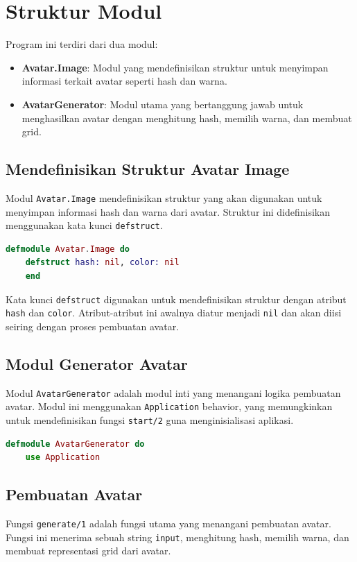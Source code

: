 \section{Struktur Modul}
Program ini terdiri dari dua modul:

\begin{itemize}
	\item \textbf{Avatar.Image}: Modul yang mendefinisikan struktur untuk menyimpan informasi terkait avatar seperti hash dan warna.
	\item \textbf{AvatarGenerator}: Modul utama yang bertanggung jawab untuk menghasilkan avatar dengan menghitung hash, memilih warna, dan membuat grid.
\end{itemize}

\subsection{Mendefinisikan Struktur Avatar Image}
Modul \texttt{Avatar.Image} mendefinisikan struktur yang akan digunakan untuk menyimpan informasi hash dan warna dari avatar. Struktur ini didefinisikan menggunakan kata kunci \texttt{defstruct}.

\begin{lstlisting}[language=Elixir, caption={Mendefinisikan struktur Avatar Image di \texttt{lib/image.ex}}]
	defmodule Avatar.Image do
	defstruct hash: nil, color: nil
	end
\end{lstlisting}

Kata kunci \texttt{defstruct} digunakan untuk mendefinisikan struktur dengan atribut \texttt{hash} dan \texttt{color}. Atribut-atribut ini awalnya diatur menjadi \texttt{nil} dan akan diisi seiring dengan proses pembuatan avatar.

\subsection{Modul Generator Avatar}
Modul \texttt{AvatarGenerator} adalah modul inti yang menangani logika pembuatan avatar. Modul ini menggunakan \texttt{Application} behavior, yang memungkinkan untuk mendefinisikan fungsi \texttt{start/2} guna menginisialisasi aplikasi.

\begin{lstlisting}[language=Elixir, caption={Definisi modul Avatar Generator di \texttt{lib/avatar.ex}}]
	defmodule AvatarGenerator do
	use Application
\end{lstlisting}

\subsection{Pembuatan Avatar}
Fungsi \texttt{generate/1} adalah fungsi utama yang menangani pembuatan avatar. Fungsi ini menerima sebuah string \texttt{input}, menghitung hash, memilih warna, dan membuat representasi grid dari avatar.

